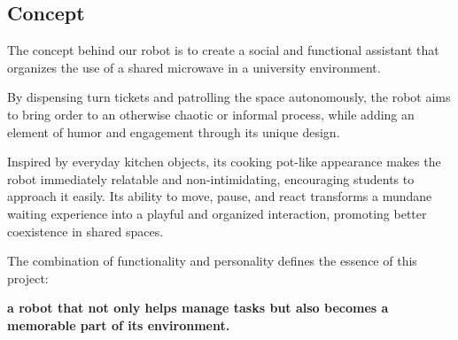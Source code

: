 \subsection{Concept}

The concept behind our robot is to create a social and functional assistant that organizes the use of a shared microwave in a university environment.

By dispensing turn tickets and patrolling the space autonomously, the robot aims to bring order to an otherwise chaotic or informal process, while adding an element of humor and engagement through its unique design.

Inspired by everyday kitchen objects, its cooking pot-like appearance makes the robot immediately relatable and non-intimidating, encouraging students to approach it easily. Its ability to move, pause, and react transforms a mundane waiting experience into a playful and organized interaction, promoting better coexistence in shared spaces.

The combination of functionality and personality defines the essence of this project:

\textbf{a robot that not only helps manage tasks but also becomes a memorable part of its environment.}
